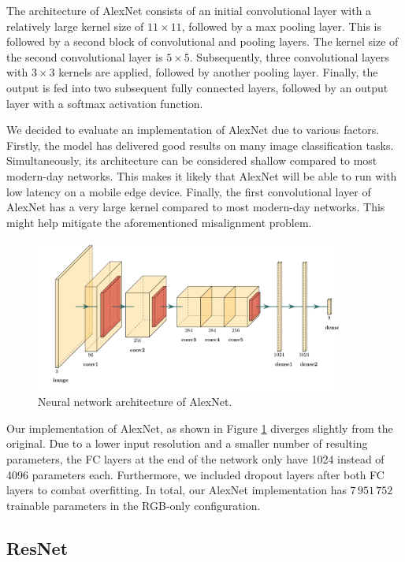 \documentclass{l4proj}
\begin{document}
The architecture of AlexNet consists of an initial convolutional layer with a relatively large kernel size of $11 \times 11$, followed by a max pooling layer. This is followed by a second block of convolutional and pooling layers. The kernel size of the second convolutional layer is $5 \times 5$. Subsequently, three convolutional layers with $3 \times 3$ kernels are applied, followed by another pooling layer. Finally, the output is fed into two subsequent fully connected layers, followed by an output layer with a softmax activation function.

We decided to evaluate an implementation of AlexNet due to various factors. Firstly, the model has delivered good results on many image classification tasks. Simultaneously, its architecture can be considered shallow compared to most modern-day networks. This makes it likely that AlexNet will be able to run with low latency on a mobile edge device. Finally, the first convolutional layer of AlexNet has a very large kernel compared to most modern-day networks. This might help mitigate the aforementioned misalignment problem.

\begin{figure}[ht]
  \centering
  \includegraphics[width=0.9\textwidth]{images/models/alexnet}
  \caption{Neural network architecture of AlexNet.}
  \label{fig:alexnet}
\end{figure}

Our implementation of AlexNet, as shown in Figure \ref{fig:alexnet} diverges slightly from the original. Due to a lower input resolution and a smaller number of resulting parameters, the FC layers at the end of the network only have 1024 instead of 4096 parameters each. Furthermore, we included dropout layers after both FC layers to combat overfitting. In total, our AlexNet implementation has $7\,951\,752$ trainable parameters in the RGB-only configuration.

\subsection{ResNet}
\label{resnet}
\end{document}
